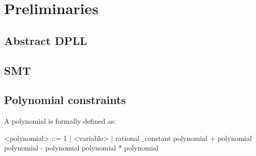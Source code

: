 \chapter{Preliminaries}
\section{Abstract DPLL}
\section{SMT}
\section{Polynomial constraints}
A polynomial is formally defined as:
\begin{center}
\begin{grammar}
<polynomial> ::= 1 | <variable> | rational\_constant 
				 \alt polynomial + polynomial
			     \alt polynomial - polynomial
			     \alt polynomial * polynomial
\end{grammar}
\end{center}